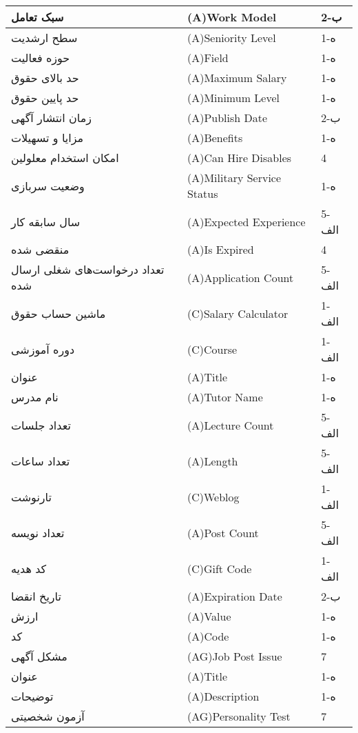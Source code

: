 \documentclass[12pt]{article}
\begin{document}
\begin{center}
\begin{table}[]
\begin{tabular}{|l|l|l|}
				\hline
				سبک تعامل & (A)Work Model & 2-ب   \\
				\hline
				سطح ارشدیت & (A)Seniority Level & 1-ه   \\
				\hline
				حوزه فعالیت & (A)Field & 1-ه   \\
				\hline
				حد بالای حقوق & (A)Maximum Salary & 1-ه   \\
				\hline
				حد پایین حقوق & (A)Minimum Level & 1-ه   \\
				\hline
				زمان انتشار آگهی & (A)Publish Date & 2-ب   \\
				\hline
				مزایا و تسهیلات & (A)Benefits & 1-ه   \\
				\hline
				امکان استخدام معلولین & (A)Can Hire Disables & 4     \\
				\hline
				وضعیت سربازی & (A)Military Service Status & 1-ه   \\
				\hline
				سال سابقه کار & (A)Expected Experience & 5-الف \\
				\hline
				منقضی شده & (A)Is Expired & 4     \\
				\hline
				تعداد درخواست‌های شغلی ارسال شده & (A)Application Count & 5-الف \\
				\hline
				ماشین حساب حقوق & (C)Salary Calculator & 1-الف \\
				\hline
				دوره آموزشی & (C)Course & 1-الف \\
				\hline
				عنوان & (A)Title & 1-ه   \\
				\hline
				نام مدرس & (A)Tutor Name & 1-ه   \\
				\hline
				تعداد جلسات & (A)Lecture Count & 5-الف \\
				\hline
				تعداد ساعات & (A)Length & 5-الف \\
				\hline
				تارنوشت & (C)Weblog & 1-الف \\
				\hline
				تعداد نویسه & (A)Post Count & 5-الف \\
				\hline
				کد هدیه & (C)Gift Code & 1-الف \\
				\hline
				تاریخ انقضا & (A)Expiration Date & 2-ب   \\
				\hline
				ارزش & (A)Value & 1-ه   \\
				\hline
				کد & (A)Code & 1-ه   \\
				\hline
				مشکل آگهی & (AG)Job Post Issue & 7     \\
				\hline
				عنوان & (A)Title & 1-ه   \\
				\hline
				توضیحات & (A)Description & 1-ه   \\
				\hline
				آزمون شخصیتی & (AG)Personality Test & 7     \\

\end{tabular}
\end{table}
\end{center}
\end{document}

